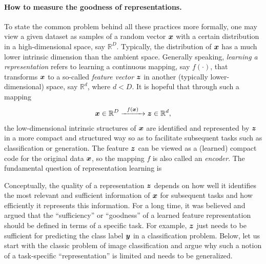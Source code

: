 \documentclass[../../book-main.tex]{subfiles}
\begin{document}
\paragraph{How to measure the goodness of representations.}
To state the common problem behind all these practices more formally, one may view a given dataset as samples of a random vector $\bm{x}$ with a certain distribution in a high-dimensional space, say $\mathbb{R}^D$. Typically, the distribution of $\bm{x}$ has a much lower intrinsic dimension than the ambient space. Generally speaking,  {\em learning a representation} refers to learning a continuous mapping, say $f(\cdot)$, that transforms $\bm{x}$ to a so-called {\em feature vector} $\bm{z}$ in another (typically lower-dimensional) space, say $\mathbb{R}^d$, where $d < D$. It is hopeful that through such a mapping
\begin{equation}
	\bm{x} \in \mathbb{R}^D \xrightarrow{\hspace{2mm} f(\bm{x})\hspace{2mm}} \bm{z}  \in \mathbb{R}^d,
	\label{eqn:chap4-1-encoding}
\end{equation}
the low-dimensional intrinsic structures of $\bm{x}$ are identified and represented by $\bm{z}$ in a more compact and structured way so as to facilitate subsequent tasks such as classification or generation. The feature $\bm{z}$ can be viewed as a (learned) compact code for the original data $\bm{x}$, so the mapping $f$ is also called an \textit{encoder}.
The fundamental question of representation learning is
\begin{center}
\end{center}

Conceptually, the quality of a representation $\bm{z}$ depends on how well it identifies the most relevant and sufficient information of $\bm{x}$ for subsequent tasks and how efficiently it represents this information.
For a long time, it was believed and argued that the ``sufficiency'' or ``goodness'' of a learned feature representation should be defined in terms of a specific task. For example, $\bm{z}$ just needs to be sufficient for predicting the class label $\bm{y}$ in a classification problem. Below, let us start with the classic problem of image classification and argue why such a notion of a task-specific ``representation'' is limited and needs to be generalized.

\end{document}
